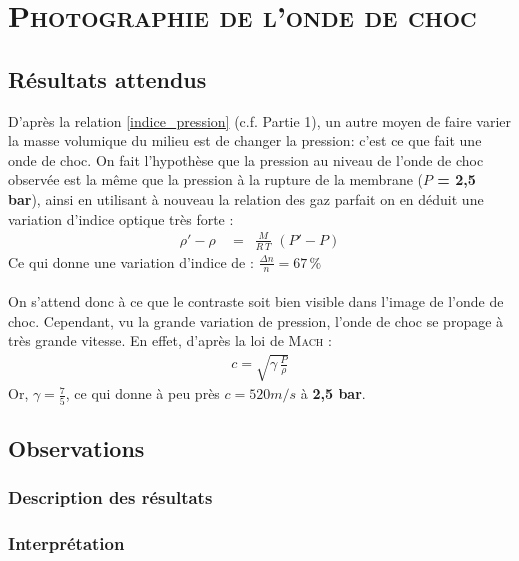 \renewcommand{\chaptername}{\scshape Partie}
\chapter{\normalfont \scshape Photographie de l'onde de choc}
\section{Résultats attendus}
D’après la relation \ref{indice_pression} (c.f. Partie 1), un autre moyen de faire varier la masse volumique du milieu est de changer la pression: c’est ce que fait une onde de choc. On fait l’hypothèse que la pression au niveau de l’onde de choc observée est la même que la pression à la rupture de la membrane (\textbf{$P$ = 2,5 bar}), ainsi en utilisant à nouveau la relation des gaz parfait on en déduit une variation d’indice optique très forte  :
\begin{align}
	\rho' - \rho \,&= \,\,\,\frac{M}{R \, T}\,\,(P'-P)
\end{align}
Ce qui donne une variation d'indice de : $\frac{\Delta n}{n} = 67\,\%$\\ \\
On s'attend donc à ce que le contraste soit bien visible dans l'image de l'onde de choc. Cependant, vu la grande variation de pression, l'onde de choc se propage à très grande vitesse. En effet, d'après la loi de \textsc{Mach} :
\begin{align}
	c= \sqrt{\gamma\,\frac{P}{\rho}}
\end{align}
Or, \textbf{$\gamma = \frac{7}{5}$}, ce qui donne à peu près \textbf{$c=520 m/s$} à \textbf{2,5 bar}.
\section{Observations}
\subsection{Description des résultats}
\subsection{Interprétation}